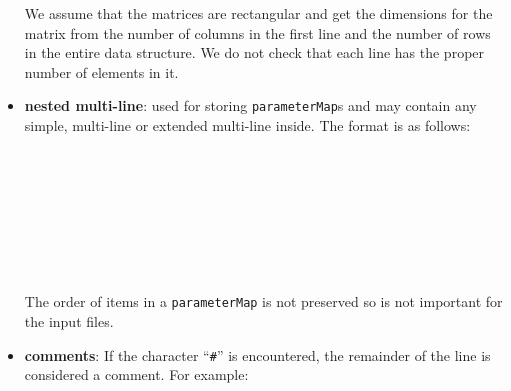 \documentclass[10pt]{article}
\begin{document}
\begin{itemize}
			\\
			\hspace*{0.5 in}{\tt value00 value01 value02 ...}\\
			\hspace*{0.5 in}{\tt value10 value11 value12 ...}\\
			\hspace*{0.5 in}{\tt ...}\\
			\hspace*{0.25 in}{\tt \}}\\
	We assume that the matrices are rectangular and get the dimensions for the matrix from the number of columns in the first line and the number of rows in the entire data structure.  We do not check that each line has the proper number of elements in it.
	\item {\bf nested multi-line}: used for storing {\tt parameterMap}s and may contain any simple, multi-line or extended multi-line inside.  The format is as follows:\\
			\\
			\hspace*{0.5 in}{\tt subtype0 subname0 subvalue0}\\
			\\
			\hspace*{0.75 in}{\tt value11}\\
			\hspace*{0.75 in}{\tt ...}\\
			\hspace*{0.5 in}{\tt \} } \\
			\hspace*{0.5 in}{\tt ...}\\
			\hspace*{0.25 in}{\tt \} }\\
	The order of items in a {\tt parameterMap} is not preserved so is not important for the input files.
	\item {\bf comments}: If the character ``{\tt \#}'' is encountered, the remainder of the line is considered a comment.  For example:\\
			\hspace*{0.25 in}{\tt \#int   lmax   0 \# the old value}\\
			\hspace*{0.25 in}{\tt int   lmax   2 \# the new value}\\
			\hspace*{0.25 in}{\tt string	filename	output.dat \# this is the output correlation}\\
\end{itemize}
\end{document}
